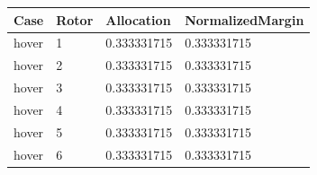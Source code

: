 \begin{tabular}{@{}llll@{}}
\toprule
Case & Rotor & Allocation & NormalizedMargin \\
\midrule
hover & 1 & 0.333331715 & 0.333331715 \\
hover & 2 & 0.333331715 & 0.333331715 \\
hover & 3 & 0.333331715 & 0.333331715 \\
hover & 4 & 0.333331715 & 0.333331715 \\
hover & 5 & 0.333331715 & 0.333331715 \\
hover & 6 & 0.333331715 & 0.333331715 \\
\bottomrule
\end{tabular}
